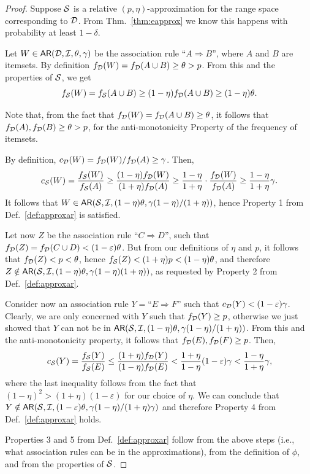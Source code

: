 \begin{proof}
  Suppose ${\cal S}$ is a relative $(p,\eta)$-approximation for the range space
  corresponding to ${\cal D}$. From Thm.~\ref{thm:eapprox} we know this happens with
  probability at least $1-\delta$.

 Let $W\in\mathsf{AR}({\cal D},{\cal I},\theta,\gamma)$ be the association rule ``$A\Rightarrow
 B$'', where $A$ and $B$ are itemsets. By definition $f_{\cal D}(W)=f_{\cal D}(A\cup
 B)\ge\theta> p$. From this and the properties of ${\cal S}$, we get
\[
 f_{\cal S}(W)=f_{\cal S}(A\cup B)\ge (1-\eta)f_{\cal D}(A\cup B)\ge (1-\eta)\theta.\] 

Note that, from the fact that $f_{\cal D}(W)=f_{\cal D}(A\cup B)\ge\theta$, it follows
that $f_{\cal D}(A),f_{\cal D}(B)\ge\theta> p$, for the anti-monotonicity Property of the
frequency of itemsets.

By definition, $c_{\cal D}(W)=f_{\cal D}(W)/f_{\cal D}(A)\ge\gamma$. Then,
 \[
 c_{\cal S}(W)=\frac{f_{\cal S}(W)}{f_{\cal S}(A)}\ge
 \frac{(1-\eta)f_{\cal D}(W)}{(1+\eta)f_{\cal D}(A)}\ge\frac{1-\eta}{1+\eta}\cdot\frac{f_{\cal D}(W)}{f_{\cal D}(A)}\ge\frac{1-\eta}{1+\eta}\gamma.\]
 It follows that
 $W\in\mathsf{AR}({\cal S},{\cal I},(1-\eta)\theta,\gamma(1-\eta)/(1+\eta))$, hence
 Property 1 from Def.~\ref{def:approxar} is satisfied.

 Let now $Z$ be the association rule ``$C\Rightarrow D$'', such that
 $f_{\cal D}(Z)=f_{\cal D}(C\cup D)<(1-\varepsilon)\theta$. But from our definitions of
 $\eta$ and $p$, it follows that $f_{\cal D}(Z) < p < \theta$, hence $f_{\cal S}(Z) <
 (1+\eta)p < (1-\eta)\theta$, and therefore
 $Z\notin\mathsf{AR}({\cal S},{\cal I},(1-\eta)\theta,\gamma(1-\eta)(1+\eta))$, as
 requested by Property 2 from Def.~\ref{def:approxar}.
 
 Consider now an association rule $Y=\mbox{``}E\Rightarrow F\mbox{''}$ such that
 $c_{\cal D}(Y)<(1-\varepsilon)\gamma$. Clearly, we are only concerned with $Y$ such
 that $f_{\cal D}(Y)\ge p$, otherwise we just showed that $Y$ can not be in
 $\mathsf{AR}({\cal S},{\cal I},(1-\eta)\theta,\gamma(1-\eta)/(1+\eta))$. From this and the
 anti-monotonicity property, it follows that $f_{\cal D}(E),f_{\cal D}(F)\ge p$. Then,
 \[
  c_{\cal S}(Y)=\frac{f_{\cal S}(Y)}{f_{\cal S}(E)}\le\frac{(1+\eta)f_{\cal D}(Y)}{(1-\eta)f_{\cal D}(E)}
  <\frac{1+\eta}{1-\eta} (1-\varepsilon)\gamma < \frac{1-\eta}{1+\eta}\gamma,\]
where the last inequality follows from the fact that
$(1-\eta)^2>(1+\eta)(1-\varepsilon)$ for our choice of $\eta$. We can
conclude that
$Y\notin\mathsf{AR}({\cal S},{\cal I},(1-\varepsilon)\theta,\gamma(1-\eta)/(1+\eta)\gamma)$ and
therefore Property 4 from Def.~\ref{def:approxar} holds.

  Properties 3 and 5 from Def.~\ref{def:approxar} follow from the above steps (i.e.,
  what association rules can be in the approximations), from the definition of
  $\phi$, and from the properties of ${\cal S}$.
\end{proof}

